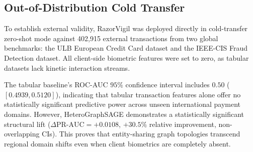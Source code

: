 \documentclass[conference]{IEEEtran}
\begin{document}
\subsection{Out-of-Distribution Cold Transfer}
To establish external validity, RazorVigil was deployed directly in cold-transfer zero-shot mode against 402,915 external transactions from two global benchmarks: the ULB European Credit Card dataset and the IEEE-CIS Fraud Detection dataset. All client-side biometric features were set to zero, as tabular datasets lack kinetic interaction streams.

\begin{table}[t]
\caption{Out-of-Distribution (OOD) Cold-Transfer Benchmarking (1,000 Bootstrap Resamples)}
\setlength{\tabcolsep}{3.5pt}
\footnotesize
\label{tab:ood}
\centering\small
{}
\end{table}

The tabular baseline's ROC-AUC $95\%$ confidence interval includes $0.50$ ($[0.4939, 0.5120]$), indicating that tabular transaction features alone offer no statistically significant predictive power across unseen international payment domains. However, HeteroGraphSAGE demonstrates a statistically significant structural lift ($\Delta\text{PR-AUC} = +0.0108$, $+30.5\%$ relative improvement, non-overlapping CIs). This proves that entity-sharing graph topologies transcend regional domain shifts even when client biometrics are completely absent.
\end{document}
